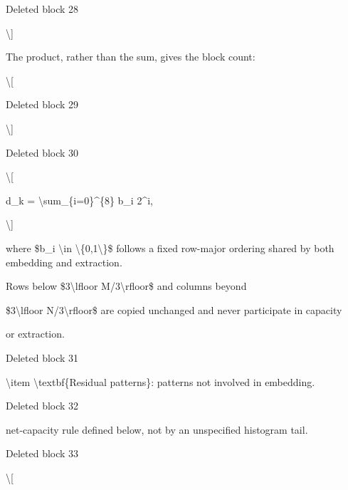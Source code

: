 \documentclass[a4paper,fleqn]{cas-dc}
\newenvironment{RevisionDeletion}{%
  \par\begingroup\color{revisionred}\footnotesize\ttfamily
  \setlength{\parindent}{0pt}\setlength{\parskip}{1pt}\obeyspaces
}{\par\endgroup}
\begin{document}
\begin{RevisionDeletion}
Deleted block 28\par
\textbackslash{}]\par
The product, rather than the sum, gives the block count:\par
\textbackslash{}[\par
\end{RevisionDeletion}

\begin{RevisionDeletion}
Deleted block 29\par
\textbackslash{}]\par
\end{RevisionDeletion}

\begin{RevisionDeletion}
Deleted block 30\par
\textbackslash{}[\par
d\_k = \textbackslash{}sum\_\{i=0\}\textasciicircum{}\{8\} b\_i 2\textasciicircum{}i,\par
\textbackslash{}]\par
where \$b\_i \textbackslash{}in \textbackslash{}\{0,1\textbackslash{}\}\$ follows a fixed row-major ordering shared by both embedding and extraction.\par
Rows below \$3\textbackslash{}lfloor M/3\textbackslash{}rfloor\$ and columns beyond\par
\$3\textbackslash{}lfloor N/3\textbackslash{}rfloor\$ are copied unchanged and never participate in capacity\par
or extraction.\par
\end{RevisionDeletion}

\begin{RevisionDeletion}
Deleted block 31\par
    \textbackslash{}item \textbackslash{}textbf\{Residual patterns\}: patterns not involved in embedding.\par
\end{RevisionDeletion}

\begin{RevisionDeletion}
Deleted block 32\par
net-capacity rule defined below, not by an unspecified histogram tail.\par
\end{RevisionDeletion}

\begin{RevisionDeletion}
Deleted block 33\par
\textbackslash{}[\par
\end{RevisionDeletion}
\end{document}

